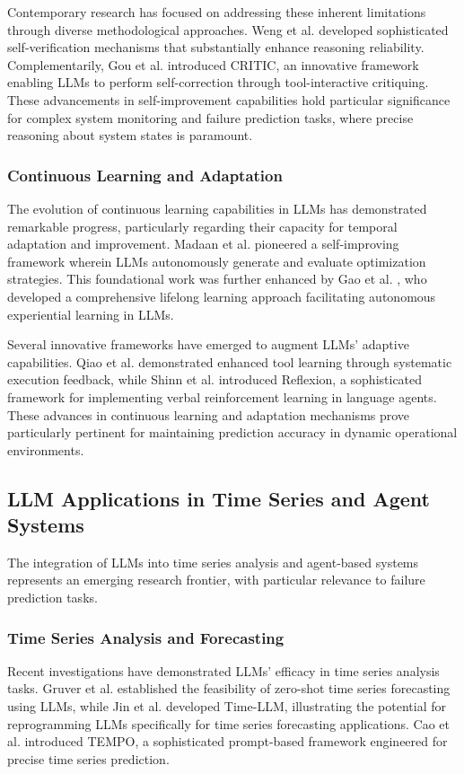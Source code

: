 \documentclass[conference]{IEEEtran}
\begin{document}
Contemporary research has focused on addressing these inherent limitations through diverse methodological approaches. Weng et al. \cite{weng2023} developed sophisticated self-verification mechanisms that substantially enhance reasoning reliability. Complementarily, Gou et al. \cite{gou2024} introduced CRITIC, an innovative framework enabling LLMs to perform self-correction through tool-interactive critiquing. These advancements in self-improvement capabilities hold particular significance for complex system monitoring and failure prediction tasks, where precise reasoning about system states is paramount.

\subsubsection{Continuous Learning and Adaptation}
The evolution of continuous learning capabilities in LLMs has demonstrated remarkable progress, particularly regarding their capacity for temporal adaptation and improvement. Madaan et al. \cite{madaan2023} pioneered a self-improving framework wherein LLMs autonomously generate and evaluate optimization strategies. This foundational work was further enhanced by Gao et al. \cite{gao2024}, who developed a comprehensive lifelong learning approach facilitating autonomous experiential learning in LLMs.

Several innovative frameworks have emerged to augment LLMs' adaptive capabilities. Qiao et al. \cite{qiao2024} demonstrated enhanced tool learning through systematic execution feedback, while Shinn et al. \cite{shinn2023} introduced Reflexion, a sophisticated framework for implementing verbal reinforcement learning in language agents. These advances in continuous learning and adaptation mechanisms prove particularly pertinent for maintaining prediction accuracy in dynamic operational environments.

\subsection{LLM Applications in Time Series and Agent Systems}
The integration of LLMs into time series analysis and agent-based systems represents an emerging research frontier, with particular relevance to failure prediction tasks.

\subsubsection{Time Series Analysis and Forecasting}
Recent investigations have demonstrated LLMs' efficacy in time series analysis tasks. Gruver et al. \cite{gruver2023} established the feasibility of zero-shot time series forecasting using LLMs, while Jin et al. \cite{jin2024} developed Time-LLM, illustrating the potential for reprogramming LLMs specifically for time series forecasting applications. Cao et al. \cite{cao2024} introduced TEMPO, a sophisticated prompt-based framework engineered for precise time series prediction.
\end{document}
